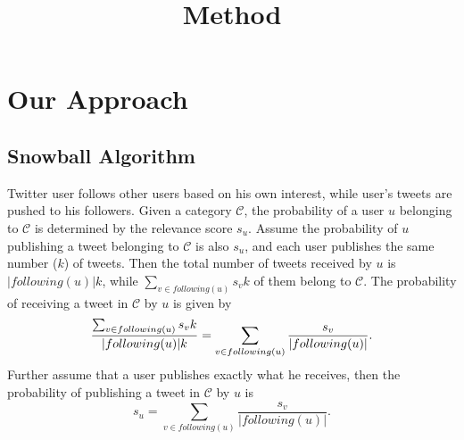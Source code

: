 \documentclass{article}
\begin{document}
\title{Method}

\newcommand{\following}{\ensuremath{following}}
\newcommand{\follower}{\ensuremath{follower}}

\maketitle \else \fi

\newcommand{\argmax}{\operatornamewithlimits{argmax}}

\section{Our Approach}\label{sec:method}

\subsection{Snowball Algorithm}
Twitter user follows other users based on his own interest, while user's tweets are pushed to his followers. Given a category $\mathcal{C}$, the probability of a user $u$ belonging to $\mathcal{C}$ is determined by the relevance score $s_u$. Assume the probability of $u$ publishing a tweet belonging to $\mathcal{C}$ is also $s_u$, and each user publishes the same number ($k$) of tweets. Then the total number of tweets received by $u$ is $|\following(u)|k$, while $\sum_{v \in \following(u)} s_v k$ of them belong to $\mathcal{C}$. The probability of receiving a tweet in $\mathcal{C}$ by $u$ is given by
$${\sum_{v \in \following(u)} s_v k \over |\following(u)|k} = \sum_{v \in following(u)}{s_v \over |\following(u)|}.$$
Further assume that a user publishes exactly what he receives, then the probability of publishing a tweet in $\mathcal{C}$ by $u$ is
\begin{equation}\label{eq:snowball}
s_u = \sum_{v \in \following(u)} \frac{s_v}{|\following(u)|}.
\end{equation}

\end{document}
